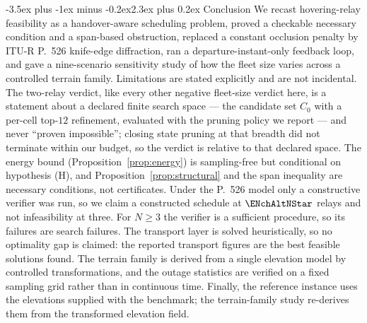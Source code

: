 \documentclass[11pt]{article}
\makeatletter
\def\section{\@startsection{section}{1}{\z@}%
    {1.0\baselineskip plus 0.25\baselineskip minus 0.25\baselineskip}%
    {0.4\baselineskip}%
    {\normalfont\normalsize\centering\bfseries}}%
\renewcommand{\section}{\@startsection{section}{1}{\z@}%
      {-3.5ex plus -1ex minus -0.2ex}{2.3ex plus 0.2ex}%
      {\normalfont\Large\bfseries}}%
\renewcommand{\section}{\@startsection{section}{1}{\z@}%
      {-3.5ex plus -1ex minus -0.2ex}{2.3ex plus 0.2ex}%
      {\normalfont\large\bfseries}}%
\theoremstyle{dshplain}
\theoremstyle{dshdefn}
\makeatother
\begin{document}
\section{Conclusion}
\label{sec:conclusion}
We recast hovering-relay feasibility as a handover-aware scheduling problem,
proved a checkable necessary condition and a span-based obstruction, replaced a
constant occlusion penalty by ITU-R P.~526 knife-edge diffraction, ran a
departure-instant-only feedback loop, and gave a nine-scenario sensitivity study
of how the fleet size varies across a controlled terrain family.
Limitations are stated explicitly and are not incidental. The two-relay verdict,
like every other negative fleet-size verdict here, is a statement about a
declared finite search space --- the candidate set $C_0$ with a per-cell top-$12$
refinement, evaluated with the pruning policy we report --- and never ``proven
impossible''; closing state pruning at that breadth did not terminate within our
budget, so the verdict is relative to that declared space. The energy bound
(Proposition~\ref{prop:energy}) is sampling-free but conditional on hypothesis
(H), and Proposition~\ref{prop:structural} and the span inequality are necessary
conditions, not certificates. Under the P.~526 model only a constructive verifier
was run, so we claim a constructed schedule at $\ENchAltNStar$ relays and not
infeasibility at three. For $N\ge3$ the verifier is a sufficient procedure, so its
failures are search failures. The transport layer is solved heuristically, so no
optimality gap is claimed: the reported transport figures are the best feasible
solutions found. The terrain family is derived from a single elevation model by
controlled transformations, and the outage statistics are verified on a fixed
sampling grid rather than in continuous time. Finally, the reference instance uses
the elevations supplied with the benchmark; the terrain-family study re-derives
them from the transformed elevation field.



\end{document}
